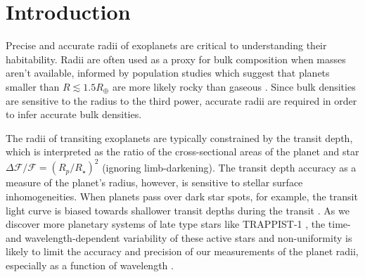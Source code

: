 %
%
%
\section{Introduction}

Precise and accurate radii of exoplanets are critical to understanding their habitability. Radii are often used as a proxy for bulk composition when masses aren't available, informed by population studies which suggest that planets smaller than $R\lesssim1.5R_\oplus$ are more likely rocky than gaseous \citep{Weiss2014,Rogers2015,Fulton2017}. Since bulk densities are sensitive to the radius to the third power, accurate radii are required in order to infer accurate bulk densities. 

The radii of transiting exoplanets are typically constrained by the transit depth, which is interpreted as the ratio of the cross-sectional areas of the planet and star $\Delta \mathcal{F}/\mathcal{F} = (R_p/R_\star)^2$ (ignoring limb-darkening). The transit depth accuracy as a measure of the planet's radius, however, is sensitive to stellar surface inhomogeneities. When planets pass over dark star spots, for example, the transit light curve is biased towards shallower transit depths during the transit \citep[see e.g.][]{Csizmadia2013,Oshagh2013}. As we discover more planetary systems of late type stars like TRAPPIST-1 \citep{Gillon2016,Gillon2017,Luger2017}, the time- and wavelength-dependent variability of these active stars and non-uniformity is likely to limit the accuracy and precision of our measurements of the planet radii, especially as a function of wavelength \citep{Roettenbacher2017,Rackham2018,Zhang2018,Morris2018c}.


